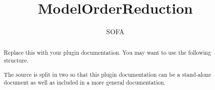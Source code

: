 \documentclass{article}
\begin{document}
\raggedright

\title{ModelOrderReduction}
\author{SOFA}

\maketitle

\begin{abstract}
Replace this with your plugin documentation. You may want to use the following structure.

The source is split in two so that this plugin documentation can be a stand-alone document as well as included in a more general documentation.
\end{abstract}


\end{document}
